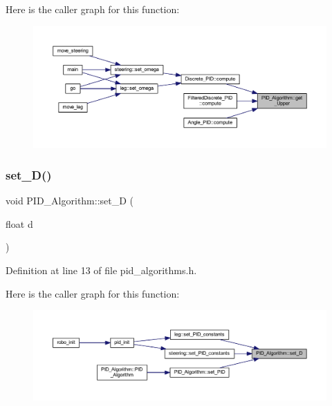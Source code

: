 Here is the caller graph for this function\+:
\nopagebreak
\begin{figure}[H]
\begin{center}
\leavevmode
\includegraphics[width=350pt]{class_p_i_d___algorithm_a0adcbfe07b44479d3c46d20037bf1013_icgraph}
\end{center}
\end{figure}
\mbox{\label{class_p_i_d___algorithm_a6e830c2340d3cebb2131a9308f558746}} 
\subsubsection{\texorpdfstring{set\_D()}{set\_D()}}
{\footnotesize\ttfamily void P\+I\+D\+\_\+\+Algorithm\+::set\+\_\+D (\begin{DoxyParamCaption}\item[{float}]{d }\end{DoxyParamCaption})\hspace{0.3cm}{\ttfamily [inline]}}



Definition at line 13 of file pid\+\_\+algorithms.\+h.

Here is the caller graph for this function\+:
\nopagebreak
\begin{figure}[H]
\begin{center}
\leavevmode
\includegraphics[width=350pt]{class_p_i_d___algorithm_a6e830c2340d3cebb2131a9308f558746_icgraph}
\end{center}
\end{figure}
\mbox{\label{class_p_i_d___algorithm_a06fbd1eb698b088e5378a224521a5323}} 
